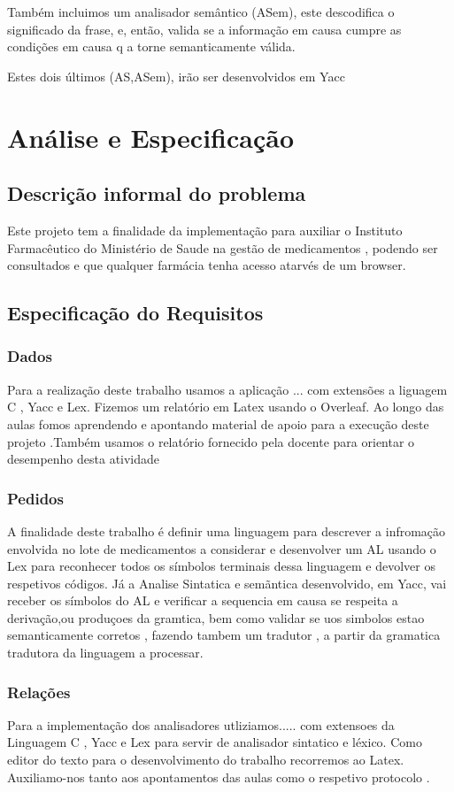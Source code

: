 \documentclass{report}
\begin{document}
 Também incluimos um analisador semântico (ASem), este descodifica o significado da frase, e, então, valida se a informação em causa cumpre as condições em causa q a torne semanticamente válida.
 
Estes dois últimos (AS,ASem), irão ser desenvolvidos em Yacc
 
 
\chapter{Análise e Especificação}
\section{Descrição informal do problema}
Este projeto tem a finalidade da implementação para auxiliar o Instituto Farmacêutico do Ministério de Saude na gestão de medicamentos , podendo ser consultados e que qualquer farmácia tenha acesso atarvés de um browser. 
\section{Especificação do Requisitos}
\subsection{Dados}
Para a realização deste trabalho usamos a aplicação ... com extensões a liguagem C , Yacc e Lex. Fizemos um relatório em Latex usando o Overleaf. Ao longo das aulas fomos aprendendo e apontando material de apoio para a execução deste projeto .Também usamos o relatório fornecido pela docente para orientar o desempenho desta atividade
\subsection{Pedidos}
A finalidade deste trabalho é definir uma linguagem para descrever a infromação envolvida no lote de medicamentos a considerar e desenvolver um AL usando o Lex para reconhecer todos os símbolos terminais dessa linguagem e devolver os respetivos códigos. Já a Analise Sintatica e semãntica desenvolvido, em Yacc, vai receber os símbolos do AL e verificar a sequencia em causa se respeita a derivação,ou produçoes da gramtica, bem como validar se uos simbolos estao semanticamente corretos , fazendo tambem um tradutor , a partir da gramatica tradutora da linguagem a processar. 
\subsection{Relações}
Para a implementação dos analisadores utliziamos..... com extensoes da Linguagem C  , Yacc e Lex para servir de analisador sintatico e léxico.
Como editor do texto para o desenvolvimento do trabalho recorremos ao Latex. Auxiliamo-nos tanto aos apontamentos das aulas como o respetivo protocolo .
\end{document}
